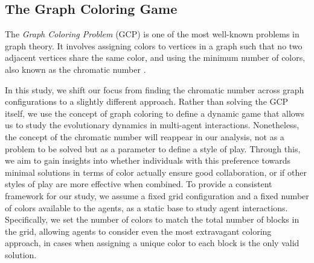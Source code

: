 \subsection{The Graph Coloring Game}
\label{sec:2.1}

    The \emph{Graph Coloring Problem} (GCP) is one of the most well-known problems in graph theory. It involves assigning colors to vertices in a graph such that no two adjacent vertices share the same color, and using the minimum number of colors, also known as the chromatic number \cite{watkins2023generating}.\tinydouble

    \noindent
    In this study, we shift our focus from finding the chromatic number across graph configurations to a slightly different approach. Rather than solving the GCP itself, we use the concept of graph coloring to define a dynamic game that allows us to study the evolutionary dynamics in multi-agent interactions. Nonetheless, the concept of the chromatic number will reappear in our analysis, not as a problem to be solved but as a parameter to define a style of play. Through this, we aim to gain insights into whether individuals with this preference towards minimal solutions in terms of color actually ensure good collaboration, or if other styles of play are more effective when combined. To provide a consistent framework for our study, we assume a fixed grid configuration and a fixed number of colors available to the agents, as a static base to study agent interactions. Specifically, we set the number of colors to match the total number of blocks in the grid, allowing agents to consider even the most extravagant coloring approach, in cases when assigning a unique color to each block is the only valid solution.
